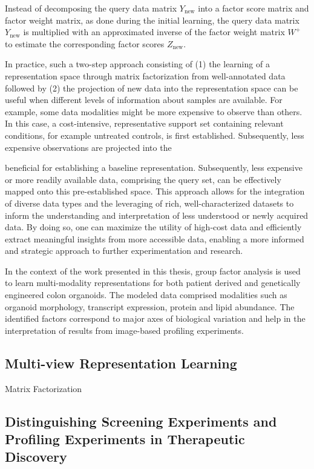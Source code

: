 \begin{flushleft}
Instead of decomposing the query data matrix \(Y_{\text{new}}\) into a factor score matrix and factor weight matrix, as done during the initial learning, the query data matrix  \(Y_{\text{new}}\) is multiplied with an approximated inverse of the factor weight matrix \( W^+ \) to estimate the corresponding factor scores \( Z_{\text{new}} \). 

In practice, such a two-step approach consisting of (1) the learning of a representation space through matrix factorization from well-annotated data followed by (2) the projection of new data into the representation space can be useful when different levels of information about samples are available. For example, some data modalities might be more expensive to observe than others. In this case, a cost-intensive, representative support set containing relevant conditions, for example untreated controls, is first established. Subsequently, less expensive observations are projected into the 

beneficial for establishing a baseline representation. Subsequently, less expensive or more readily available data, comprising the query set, can be effectively mapped onto this pre-established space. This approach allows for the integration of diverse data types and the leveraging of rich, well-characterized datasets to inform the understanding and interpretation of less understood or newly acquired data. By doing so, one can maximize the utility of high-cost data and efficiently extract meaningful insights from more accessible data, enabling a more informed and strategic approach to further experimentation and research.


In the context of the work presented in this thesis, group factor analysis is used to learn multi-modality representations for both patient derived and genetically engineered colon organoids. The modeled data comprised modalities such as organoid morphology, transcript expression, protein and lipid abundance. The identified factors correspond to major axes of biological variation and help in the interpretation of results from image-based profiling experiments. 


\subsection{Multi-view Representation Learning}

Matrix Factorization

\subsection{Distinguishing Screening Experiments and Profiling Experiments in Therapeutic Discovery}


\end{flushleft}
